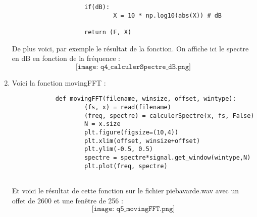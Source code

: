 \documentclass[12pt]{article}
\begin{document}
\begin{enumerate}
\begin{verbatim}
					if(dB): 
							X = 10 * np.log10(abs(X)) # dB
					
					return (F, X)
		\end{verbatim}
		De plus voici, par exemple le résultat de la fonction. On affiche ici le spectre en dB en fonction de la fréquence :
		$$
			\texttt{[image: q4\_calculerSpectre\_dB.png]}
		$$
		
	\item
	
		Voici la fonction movingFFT :
		\begin{verbatim}
			def movingFFT(filename, winsize, offset, wintype):
					(fs, x) = read(filename)
					(freq, spectre) = calculerSpectre(x, fs, False)
					N = x.size
					plt.figure(figsize=(10,4))
					plt.xlim(offset, winsize+offset)
					plt.ylim(-0.5, 0.5)
					spectre = spectre*signal.get_window(wintype,N)
					plt.plot(freq, spectre)
				
		\end{verbatim}
		Et voici le résultat de cette fonction sur le fichier piebavarde.wav avec un offet de 2600 et une fenêtre de 256 :
		$$
			\texttt{[image: q5\_movingFFT.png]}
		$$
		
\end{enumerate}
\end{document}
